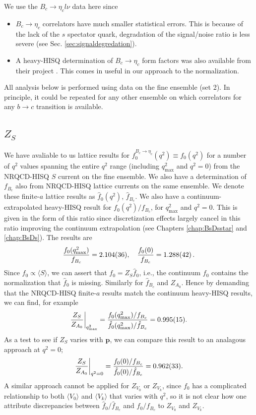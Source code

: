 We use the $B_c \to \eta_c l\nu$ data here since
\begin{itemize}
\item
  $B_c\to \eta_c$ correlators have much smaller statistical errors. This is because of the lack of the $s$ spectator quark, degradation of the signal/noise ratio is less severe (see Sec. \ref{sec:signaldegredation}).
\item
  A heavy-HISQ determination of $B_c\to \eta_c$ form factors was also available from their project \cite{Colquhoun:2016osw}. This comes in useful in our approach to the normalization.
\end{itemize}
All analysis below is performed using data on the fine ensemble (set 2). In principle, it could be repeated for any other ensemble on which correlators for any $b\to c$ transition is available.

\subsection{$Z_S$}
\label{sec:Zs}

We have avaliable to us lattice results for $f_0^{B_c\to \eta_c}(q^2)\equiv f_0(q^2)$ for a number of $q^2$ values spanning the entire $q^2$ range (including $q^2_{\text{max}}$ and $q^2=0$) from the NRQCD-HISQ $S$ current on the fine ensemble. We also have a determination of $f_{B_c}$ also from NRQCD-HISQ lattice currents on the same ensemble. We denote these finite-$a$ lattice results as $\hat{f}_0(q^2)$, $\hat{f}_{B_c}$. We also have a continuum-extrapolated heavy-HISQ result for $f_0(q^2)/f_{B_c}$, for $q^2_{\text{max}}$ and $q^2=0$. This is given in the form of this ratio since discretization effects largely cancel in this ratio improving the continuum extrapolation (see Chapters \ref{chap:BsDsstar} and \ref{chap:BsDs}). The results are
\begin{align}
  {f_0(q^2_{\text{max}})\over f_{B_c}} = 2.104(36),\quad {f_0(0)\over f_{B_c}} = 1.288(42)\,.
  \label{eq:Andrews_numbers}
\end{align}
Since $f_0\propto \langle S \rangle$, we can assert that $f_0 = Z_S \hat{f}_0$, i.e., the continuum $f_0$ contains the normalization that $\hat{f}_0$ is missing. Similarly for $\hat{f}_{B_c}$ and $Z_{A_0}$. Hence by demanding that the NRQCD-HISQ finite-$a$ results match the continuum heavy-HISQ results, we can find, for example
\begin{align}
  {Z_S \over Z_{A_0}}\bigg\vert_{q^2_{\text{max}}} = {f_0(q^2_{\text{max}})/f_{B_c}\over \hat{f}_0(q^2_{\text{max}})/\hat{f}_{B_c}} = 0.995(15).
\end{align}
As a test to see if $Z_S$ varies with ${\textbf{p}}$, we can compare this result to an analagous approach at $q^2=0$;
\begin{align}
  {Z_S \over Z_{A_0}}\bigg\vert_{q^2=0} = {f_0(0)/f_{B_c}\over \hat{f}_0(0)/\hat{f}_{B_c}} = 0.962(33).
\end{align}
A similar approach cannot be applied for $Z_{V_0}$ or $Z_{V_k}$, since $f_0$ has a complicated relationship to both $\langle V_0 \rangle$ and $\langle V_k \rangle$ that varies with $q^2$, so it is not clear how one attribute discrepancies between $\hat{f}_0/\hat{f}_{B_c}$ and $f_0/f_{B_c}$ to $Z_{V_0}$ and $Z_{V_k}$.

